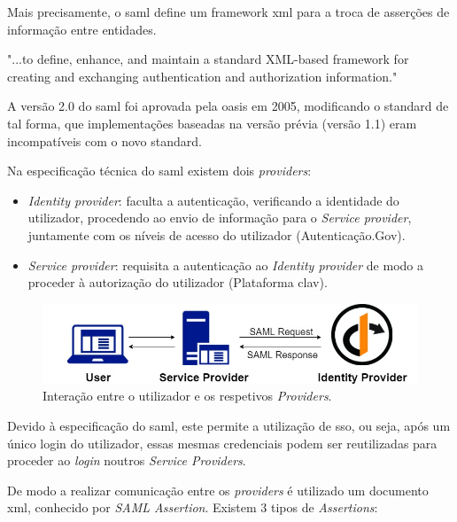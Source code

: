 Mais precisamente, o \gls{saml} define um framework \gls{xml} para a troca de asserções de informação entre entidades. 

\begin{displayquote}
"...to define, enhance, and maintain a standard XML-based framework for creating and 
exchanging authentication and authorization information."
\\[5pt]
\end{displayquote}

A versão 2.0 do \gls{saml} foi aprovada pela \gls{oasis} em 2005, modificando o standard de tal forma, que implementações baseadas na versão prévia (versão 1.1) eram incompatíveis com o novo standard.

Na especificação técnica do \gls{saml} existem dois \emph{providers}:

\begin{itemize}
    \item \emph{Identity provider}: faculta a autenticação, verificando a identidade do utilizador, procedendo ao envio de informação para o \emph{Service provider}, juntamente com os níveis de acesso do utilizador (Autenticação.Gov).
    \item \emph{Service provider}: requisita a autenticação ao \emph{Identity provider} de modo a proceder à autorização do utilizador (Plataforma \gls{clav}).
\end{itemize}

\begin{figure}[h]
    \centering
    \includegraphics[width=\textwidth]{img/saml/samlproviders.jpg}
    \caption{Interação entre o utilizador e os respetivos \emph{Providers}. \cite{samlProviderPic}}
\end{figure}

Devido à especificação do \gls{saml}, este permite a utilização de \gls{sso}, ou seja, após um único login do utilizador, essas mesmas credenciais podem ser reutilizadas para proceder ao \emph{login} noutros \emph{Service Providers}.

De modo a realizar comunicação entre os \emph{providers} é utilizado um documento \gls{xml}, conhecido por \emph{SAML Assertion}. Existem 3 tipos de \emph{Assertions}:

